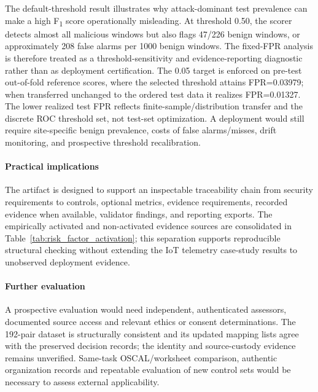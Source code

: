 \documentclass[12pt,a4paper]{article}
\begin{document}
The default-threshold result illustrates why attack-dominant test prevalence can make a high F\textsubscript{1} score operationally misleading. At threshold 0.50, the scorer detects almost all malicious windows but also flags 47/226 benign windows, or approximately 208 false alarms per 1000 benign windows. The fixed-FPR analysis is therefore treated as a threshold-sensitivity and evidence-reporting diagnostic rather than as deployment certification. The 0.05 target is enforced on pre-test out-of-fold reference scores, where the selected threshold attains FPR=0.03979; when transferred unchanged to the ordered test data it realizes FPR=0.01327. The lower realized test FPR reflects finite-sample/distribution transfer and the discrete ROC threshold set, not test-set optimization. A deployment would still require site-specific benign prevalence, costs of false alarms/misses, drift monitoring, and prospective threshold recalibration.


\paragraph{Practical implications} The artifact is designed to support an inspectable traceability chain from security requirements to controls, optional metrics, evidence requirements, recorded evidence when available, validator findings, and reporting exports. The empirically activated and non-activated evidence sources are consolidated in Table~\ref{tab:risk_factor_activation}; this separation supports reproducible structural checking without extending the IoT telemetry case-study results to unobserved deployment evidence.

\paragraph{Further evaluation} A prospective evaluation would need independent, authenticated assessors, documented source access and relevant ethics or consent determinations. The 192-pair dataset is structurally consistent and its updated mapping lists agree with the preserved decision records; the identity and source-custody evidence remains unverified. Same-task OSCAL/worksheet comparison, authentic organization records and repeatable evaluation of new control sets would be necessary to assess external applicability.


\end{document}
